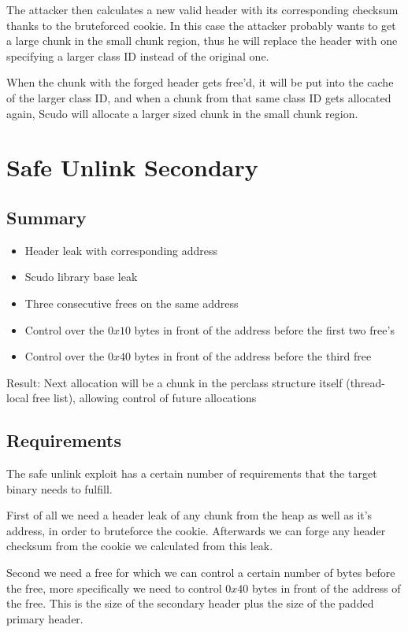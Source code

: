 \documentclass[a4paper,11pt,oneside]{report}
\begin{document}
The attacker then calculates a new valid header with its corresponding checksum thanks to
the bruteforced cookie. In this case the attacker probably wants to get a large chunk in
the small chunk region, thus he will replace the header with one specifying a larger class
ID instead of the original one.


When the chunk with the forged header gets free'd, it will be put into the cache of the
larger class ID, and when a chunk from that same class ID gets allocated again, Scudo will
allocate a larger sized chunk in the small chunk region.

\section{Safe Unlink Secondary}


\subsection{Summary}

\begin{itemize}
  \item Header leak with corresponding address
  \item Scudo library base leak
  \item Three consecutive frees on the same address
  \item Control over the $0x10$ bytes in front of the address before the first two free's
  \item Control over the $0x40$ bytes in front of the address before the third free
\end{itemize}

Result:
Next allocation will be a chunk in the perclass structure itself (thread-local free list),
allowing control of future allocations


\subsection{Requirements}

The safe unlink exploit has a certain number of requirements that the target binary needs to fulfill.

First of all we need a header leak of any chunk from the heap as well as it's address, in order to bruteforce the cookie. Afterwards we can forge any header checksum from the cookie we calculated from this leak.

Second we need a free for which we can control a certain number of bytes before the free, more specifically we need to control $0x40$ bytes in front of the address of the free. This is the size of the secondary header plus the size of the padded primary header.
\end{document}
